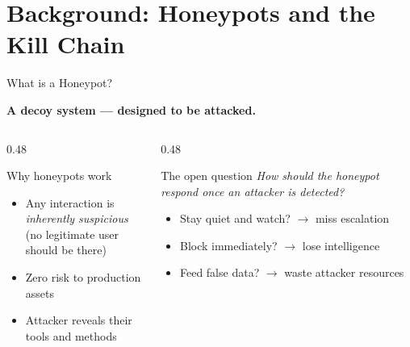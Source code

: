 \documentclass[aspectratio=169, 12pt]{beamer}
\begin{document}
\section{Background: Honeypots and the Kill Chain}

\begin{frame}{What is a Honeypot?}
  \begin{center}
    \Large\textbf{A decoy system — designed to be attacked.}
  \end{center}
  \vspace{0.3cm}
  \begin{columns}[T]
    \begin{column}{0.48\textwidth}
      \begin{exampleblock}{Why honeypots work}
        \begin{itemize}
          \item Any interaction is \emph{inherently suspicious}\\
                (no legitimate user should be there)
          \item Zero risk to production assets
          \item Attacker reveals their tools and methods
        \end{itemize}
      \end{exampleblock}
    \end{column}
    \begin{column}{0.48\textwidth}
      \begin{alertblock}{The open question}
        \emph{How should the honeypot respond once an attacker is detected?}
        \begin{itemize}
          \item Stay quiet and watch? $\to$ miss escalation
          \item Block immediately? $\to$ lose intelligence
          \item Feed false data? $\to$ waste attacker resources
        \end{itemize}
      \end{alertblock}
    \end{column}
  \end{columns}
\end{frame}
\end{document}
